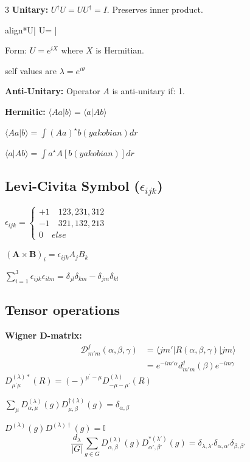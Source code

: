 \documentclass[10pt,a4paper]{article}
\newcommand{\important}[1]{\begin{empheq}[box=\fbox]{align*}#1\end{empheq}}
\begin{document}
\begin{multicols*}{3}
\textbf{Unitary:} $U^\dagger U = U U^\dagger = I$. Preserves inner product.
\important{\langle U\psi | U\phi \rangle = \langle \psi | \phi \rangle}
Form: $U = e^{iX}$ where $X$ is Hermitian.

self values are $\lambda=e^{i\theta}$

\textbf{Anti-Unitary:} Operator $A$ is anti-unitary if:
1.

\textbf{Hermitic:} $\langle Aa|b\rangle=\langle a|Ab\rangle$

$\langle Aa|b\rangle = \int (Aa)^\star b (yakobian) dr$

$\langle a|Ab\rangle = \int a^\star A[b (yakobian)] dr$

\subsection*{Levi-Civita Symbol ($\epsilon_{ijk}$)}
$\epsilon_{ijk} = \begin{cases} +1 \quad 123,231,312\\ -1 \quad 321,132,213 \\ 0 \quad else \end{cases}$

$(\mathbf{A} \times \mathbf{B})_i = \epsilon_{ijk} A_j B_k$

$\sum_{i=1}^3\epsilon_{ijk} \epsilon_{ilm} = \delta_{jl}\delta_{km} - \delta_{jm}\delta_{kl}$

\subsection*{Tensor operations}

\textbf{Wigner D-matrix:} 
\begin{align*}
    \mathcal{D}_{m'm}^j(\alpha, \beta, \gamma) &= \langle jm' | R(\alpha, \beta, \gamma) | jm \rangle \\ &= e^{-im'\alpha} d_{m'm}^j(\beta) e^{-im\gamma}
\end{align*}
$D_{\mu^{\prime}\mu}^{\left(\lambda\right)\ast}\left(R\right)=\left(-\right)^{\mu^{\prime}-\mu}D_{-\mu-\mu^{\prime}}^{\left(\lambda\right)}\left(R\right)$

$\sum_{\mu} D_{\alpha,\mu}^{(\lambda)}(g) D_{\mu,\beta}^{\dagger(\lambda)}(g) = \delta_{\alpha,\beta}$

$D^{(\lambda)}(g) D^{(\lambda)\dagger}(g) = \mathbb{I}$
$$\frac{d_\lambda}{|G|} \sum_{g \in G} D_{\alpha,\beta}^{(\lambda)}(g) D_{\alpha',\beta'}^{*(\lambda')}(g) = \delta_{\lambda,\lambda'} \delta_{\alpha,\alpha'} \delta_{\beta,\beta'}$$


\end{multicols*}
\end{document}
